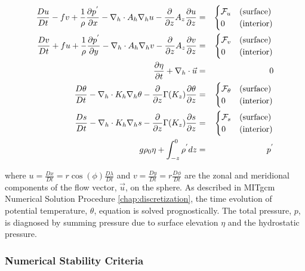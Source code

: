 \begin{eqnarray}
\label{EQ:eg-global-model_equations}
\frac{Du}{Dt} - fv + 
  \frac{1}{\rho}\frac{\partial p^{'}}{\partial x} - 
  \nabla_{h}\cdot A_{h}\nabla_{h}u - 
  \frac{\partial}{\partial z}A_{z}\frac{\partial u}{\partial z} 
 & = &
\begin{cases}
{\cal F}_u & \text{(surface)} \\
0 & \text{(interior)}
\end{cases}
\\
\frac{Dv}{Dt} + fu + 
  \frac{1}{\rho}\frac{\partial p^{'}}{\partial y} - 
  \nabla_{h}\cdot A_{h}\nabla_{h}v - 
  \frac{\partial}{\partial z}A_{z}\frac{\partial v}{\partial z} 
& = &
\begin{cases}
{\cal F}_v & \text{(surface)} \\
0 & \text{(interior)}
\end{cases}
\\
\frac{\partial \eta}{\partial t} + \nabla_{h}\cdot \vec{u}
&=&
0
\\
\frac{D\theta}{Dt} -
 \nabla_{h}\cdot K_{h}\nabla_{h}\theta
 - \frac{\partial}{\partial z}\Gamma(K_{z})\frac{\partial\theta}{\partial z} 
& = &
\begin{cases}
{\cal F}_\theta & \text{(surface)} \\
0 & \text{(interior)}
\end{cases}
\\
\frac{D s}{Dt} -
 \nabla_{h}\cdot K_{h}\nabla_{h}s
 - \frac{\partial}{\partial z}\Gamma(K_{z})\frac{\partial s}{\partial z} 
& = &
\begin{cases}
{\cal F}_s & \text{(surface)} \\
0 & \text{(interior)}
\end{cases}
\\
g\rho_{0} \eta + \int^{0}_{-z}\rho^{'} dz & = & p^{'}
\end{eqnarray}

\noindent where $u=\frac{Dx}{Dt}=r \cos(\phi)\frac{D \lambda}{Dt}$ and 
$v=\frac{Dy}{Dt}=r \frac{D \phi}{Dt}$ 
are the zonal and meridional components of the
flow vector, $\vec{u}$, on the sphere. As described in
MITgcm Numerical Solution Procedure \ref{chap:discretization}, the time 
evolution of potential temperature, $\theta$, equation is solved prognostically.
The total pressure, $p$, is diagnosed by summing pressure due to surface 
elevation $\eta$ and the hydrostatic pressure.
\\

\subsubsection{Numerical Stability Criteria}
\label{www:tutorials}

